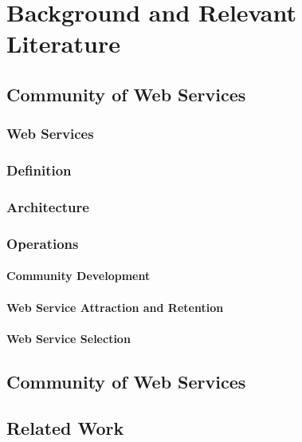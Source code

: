 \setcounter{chapter}{1}

\chapter{Background and Relevant Literature}\label{sec:MAS}



    \section{Community of Web Services}\label{sec:CommunityWS}


        \subsection{Web Services}\label{sec:BRWS}


        \subsection{Definition}\label{sec:CWSDefinition}

        \subsection{Architecture}\label{sec:CWSArchitecture}

        \subsection{Operations}\label{sec:CWSOperations}

            \subsubsection{Community Development}\label{sec:CWSCommunityDev}

            \subsubsection{Web Service Attraction and Retention}\label{sec:CWSAttraction}

            \subsubsection{Web Service Selection}\label{sec:CWSSelection}



    \section{Community of Web Services}\label{sec:BRCommunityWS}


    \section{Related Work}\label{sec:BRRelatedWork}




